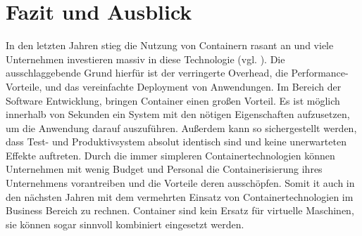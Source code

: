 \section{Fazit und Ausblick} 
\label{sec:Fazit}
In den letzten Jahren stieg die Nutzung von Containern rasant an und viele Unternehmen investieren massiv in diese Technologie (vgl. ). Die ausschlaggebende Grund hierfür ist der verringerte Overhead, die Performance-Vorteile, und das vereinfachte Deployment von Anwendungen.  Im Bereich der Software Entwicklung, bringen Container einen großen Vorteil. Es ist möglich innerhalb von Sekunden ein System mit den nötigen Eigenschaften aufzusetzen, um die Anwendung darauf auszuführen. Außerdem kann so sichergestellt werden, dass Test- und Produktivsystem absolut identisch sind und keine unerwarteten Effekte auftreten. Durch die immer simpleren Containertechnologien können Unternehmen mit wenig Budget und Personal die Containerisierung ihres Unternehmens vorantreiben und die Vorteile deren ausschöpfen. Somit it auch in den nächsten Jahren mit dem vermehrten Einsatz von Containertechnologien im Business Bereich zu rechnen. Container sind kein Ersatz für virtuelle Maschinen, sie können sogar sinnvoll kombiniert eingesetzt werden.

